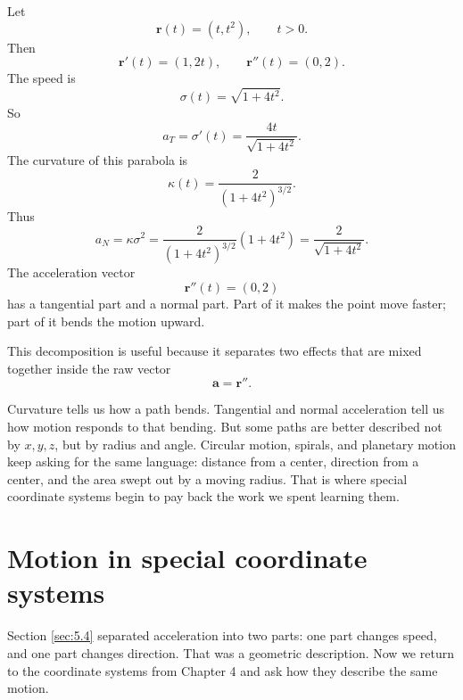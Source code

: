 \begin{example}
Let
\[
    \mathbf r(t)=(t,t^2),
    \qquad t>0.
\]
Then
\[
    \mathbf r'(t)=(1,2t),
    \qquad
    \mathbf r''(t)=(0,2).
\]
The speed is
\[
    \sigma(t)=\sqrt{1+4t^2}.
\]
So
\[
    a_T=\sigma'(t)=\frac{4t}{\sqrt{1+4t^2}}.
\]
The curvature of this parabola is
\[
    \kappa(t)=\frac{2}{(1+4t^2)^{3/2}}.
\]
Thus
\[
    a_N=\kappa\sigma^2
    =
    \frac{2}{(1+4t^2)^{3/2}}(1+4t^2)
    =
    \frac{2}{\sqrt{1+4t^2}}.
\]
The acceleration vector
\[
    \mathbf r''(t)=(0,2)
\]
has a tangential part and a normal part.  Part of it makes the point move faster; part
of it bends the motion upward.
\end{example}

This decomposition is useful because it separates two effects that are mixed together
inside the raw vector
\[
    \mathbf a=\mathbf r''.
\]

Curvature tells us how a path bends.  Tangential and normal acceleration tell us how
motion responds to that bending.  But some paths are better described not by
\(x,y,z\), but by radius and angle.  Circular motion, spirals, and planetary motion keep
asking for the same language: distance from a center, direction from a center, and the
area swept out by a moving radius.  That is where special coordinate systems begin to
pay back the work we spent learning them.

\section{Motion in special coordinate systems}
\label{sec:5.5}

Section \ref{sec:5.4} separated acceleration into two parts: one part changes speed,
and one part changes direction.  That was a geometric description.  Now we return to
the coordinate systems from Chapter 4 and ask how they describe the same motion.

